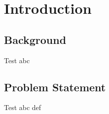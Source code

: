 
\chapter{Introduction}
\label{introduction}

\section{Background}

Test abc

\section{Problem Statement}
\label{problem_statement}

Test abc def

